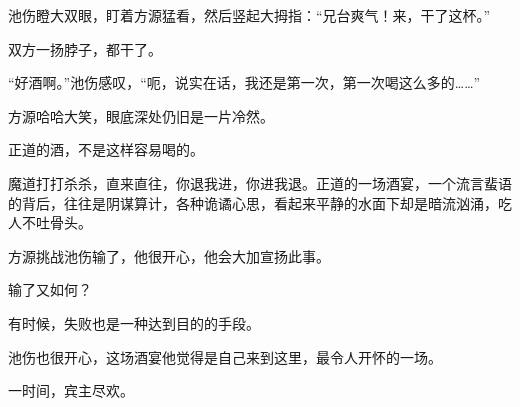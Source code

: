 \begin{this_body}
池伤瞪大双眼，盯着方源猛看，然后竖起大拇指：“兄台爽气！来，干了这杯。”

双方一扬脖子，都干了。

“好酒啊。”池伤感叹，“呃，说实在话，我还是第一次，第一次喝这么多的……”

方源哈哈大笑，眼底深处仍旧是一片冷然。

正道的酒，不是这样容易喝的。

魔道打打杀杀，直来直往，你退我进，你进我退。正道的一场酒宴，一个流言蜚语的背后，往往是阴谋算计，各种诡谲心思，看起来平静的水面下却是暗流汹涌，吃人不吐骨头。

方源挑战池伤输了，他很开心，他会大加宣扬此事。

输了又如何？

有时候，失败也是一种达到目的的手段。

池伤也很开心，这场酒宴他觉得是自己来到这里，最令人开怀的一场。

一时间，宾主尽欢。

\end{this_body}

